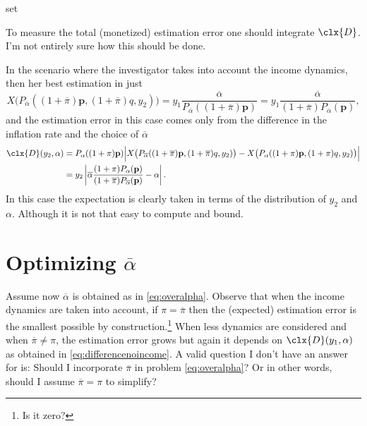 set\documentclass[english, a4paper,12pt]{article}
\begin{document}
To measure the total (monetized) estimation error one should integrate $\clx{D}$. I'm not entirely sure how this should be done.

In the scenario where the investigator takes into account the income dynamics, then her best estimation in just
	$$X\big(P_{\overline{\alpha}}((1+\overline{\pi})\mathbf{p}, (1+\overline{\pi})q, y_{2})\big) 
		= y_{1}\frac{\overline{\alpha}}{P_{\overline{\alpha}}((1+\overline{\pi})\mathbf{p})}
		= y_{1}\frac{\overline{\alpha}}{(1+\overline{\pi})P_{\overline{\alpha}}(\mathbf{p})},
	$$
and the estimation error in this case comes only from the difference in the inflation rate and the choice of $\overline{\alpha}$
	\begin{align*}
		\clx{D}(y_{2}, \alpha) 
			&=	P_{\alpha}((1+\pi)\mathbf{p}) \Big| X\big(P_{\overline{\alpha}}((1+\overline{\pi})\mathbf{p}, (1+\overline{\pi})q, y_{2})\big) 
					- X\big(P_{\alpha}((1+\pi)\mathbf{p}, (1+\pi)q, y_{2})\big) \Big|	\\
			&=	y_{2}\left| \overline{\alpha}\frac{(1+\pi)P_{\alpha}(\mathbf{p})}{(1+\overline{\pi})P_{\overline{\alpha}}(\mathbf{p})} 
							-\alpha \right|.
	\end{align*}
In this case the expectation is clearly taken in terms of the distribution of $y_{2}$ and $\alpha$. Although it is not that easy to compute and bound.

\section{Optimizing $\overline{\alpha}$}
Assume now $\overline{\alpha}$ is obtained as in \eqref{eq:overalpha}. Observe that when the income dynamics are taken into account, if $\pi = \overline{\pi}$ then the (expected) estimation error is the smallest possible by construction.\footnote{Is it zero?} When less dynamics are considered and when $\overline{\pi} \neq \pi$, the estimation error grows but again it depends on $\clx{D}(y_{1}, \alpha)$ as obtained in \eqref{eq:differencenoincome}. A valid question I don't have an answer for is: Should I incorporate $\overline{\pi}$ in problem \eqref{eq:overalpha}? Or in other words, should I assume $\overline{\pi} = \pi$ to simplify?




\end{document}

